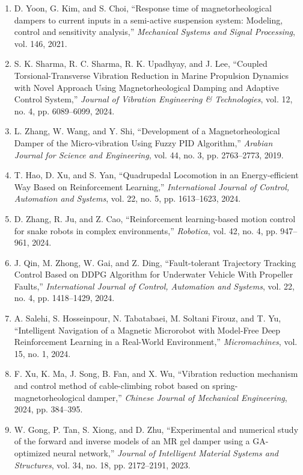 \documentclass[12pt,a4paper]{ctexart}
\begin{document}
\begin{enumerate}
\item D. Yoon, G. Kim, and S. Choi, ``Response time of magnetorheological dampers to current inputs in a semi-active suspension system: Modeling, control and sensitivity analysis,'' \emph{Mechanical Systems and Signal Processing}, vol. 146, 2021.
\item S. K. Sharma, R. C. Sharma, R. K. Upadhyay, and J. Lee, ``Coupled Torsional-Transverse Vibration Reduction in Marine Propulsion Dynamics with Novel Approach Using Magnetorheological Damping and Adaptive Control System,'' \emph{Journal of Vibration Engineering \& Technologies}, vol. 12, no. 4, pp. 6089--6099, 2024.
\item L. Zhang, W. Wang, and Y. Shi, ``Development of a Magnetorheological Damper of the Micro-vibration Using Fuzzy PID Algorithm,'' \emph{Arabian Journal for Science and Engineering}, vol. 44, no. 3, pp. 2763--2773, 2019.
\item T. Hao, D. Xu, and S. Yan, ``Quadrupedal Locomotion in an Energy-efficient Way Based on Reinforcement Learning,'' \emph{International Journal of Control, Automation and Systems}, vol. 22, no. 5, pp. 1613--1623, 2024.
\item D. Zhang, R. Ju, and Z. Cao, ``Reinforcement learning-based motion control for snake robots in complex environments,'' \emph{Robotica}, vol. 42, no. 4, pp. 947--961, 2024.
\item J. Qin, M. Zhong, W. Gai, and Z. Ding, ``Fault-tolerant Trajectory Tracking Control Based on DDPG Algorithm for Underwater Vehicle With Propeller Faults,'' \emph{International Journal of Control, Automation and Systems}, vol. 22, no. 4, pp. 1418--1429, 2024.
\item A. Salehi, S. Hosseinpour, N. Tabatabaei, M. Soltani Firouz, and T. Yu, ``Intelligent Navigation of a Magnetic Microrobot with Model-Free Deep Reinforcement Learning in a Real-World Environment,'' \emph{Micromachines}, vol. 15, no. 1, 2024.
\item F. Xu, K. Ma, J. Song, B. Fan, and X. Wu, ``Vibration reduction mechanism and control method of cable-climbing robot based on spring-magnetorheological damper,'' \emph{Chinese Journal of Mechanical Engineering}, 2024, pp. 384--395.
\item W. Gong, P. Tan, S. Xiong, and D. Zhu, ``Experimental and numerical study of the forward and inverse models of an MR gel damper using a GA-optimized neural network,'' \emph{Journal of Intelligent Material Systems and Structures}, vol. 34, no. 18, pp. 2172--2191, 2023.
\end{enumerate}
\end{document}
